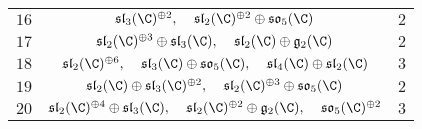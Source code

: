 \documentclass[a4paper]{article}
\begin{document}
\begin{table}[!h]
\begin{tabular}{|c|c|c|}
$16$      & $\mathfrak{sl}_3(\C)^{\oplus 2},\;\;\;\;\mathfrak{sl}_2(\C)^{\oplus 2}\oplus\mathfrak{so}_5(\C)$                                                                & $2$          \\
$17$      & $\mathfrak{sl}_2(\C)^{\oplus 3}\oplus\mathfrak{sl}_3(\C),\;\;\;\;\mathfrak{sl}_2(\C)\oplus\mathfrak{g}_2(\C)$                                                   & $2$          \\
$18$      & $\mathfrak{sl}_2(\C)^{\oplus 6},\;\;\;\;\mathfrak{sl}_3(\C)\oplus\mathfrak{so}_5(\C),\;\;\;\;\mathfrak{sl}_4(\C)\oplus\mathfrak{sl}_2(\C)$                      & $3$          \\
$19$      & $\mathfrak{sl}_2(\C)\oplus\mathfrak{sl}_3(\C)^{\oplus 2},\;\;\;\;\mathfrak{sl}_2(\C)^{\oplus 3}\oplus\mathfrak{so}_5(\C)$                                       & $2$          \\
$20$      & $\mathfrak{sl}_2(\C)^{\oplus 4}\oplus\mathfrak{sl}_3(\C),\;\;\;\;\mathfrak{sl}_2(\C)^{\oplus 2}\oplus\mathfrak{g}_2(\C),\;\;\;\;\mathfrak{so}_5(\C)^{\oplus 2}$ & $3$          \\ \hline
\end{tabular}
\end{table}
\end{document}
